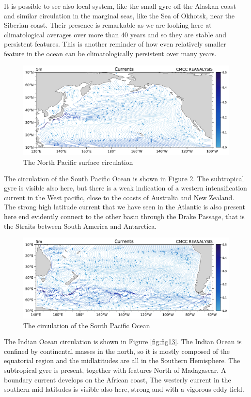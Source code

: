 It is possible to see also local system, like the small gyre off the Alaskan coast and similar circulation in the marginal seas, like the Sea of Okhotsk, near the Siberian coast. Their presence is remarkable as we are looking here at climatological averages over more than 40 years and so they are stable and persistent features. This is another reminder of how even relatively smaller feature in the ocean can be climatologically persistent over many years.

\begin{figure}[htpb]
\centering
\includegraphics[width = 0.4 \textwidth]{uploads/i36mage.png}
\caption{The North Pacific surface circulation} \label{fig:fig11}
\end{figure}

The circulation of the South Pacific Ocean is shown in Figure \ref{fig:fig12}. The subtropical gyre is visible also here, but there is a weak indication of a western intensification current in the West pacific, close to the coasts of Australia and New Zealand. The strong high latitude current that we have seen in the Atlantic is also present here end evidently connect to the other basin through the Drake Passage, that is the Straits between South America and Antarctica.

\begin{figure}[htpb]
\centering
\includegraphics[width = 0.5 \textwidth]{uploads/37image.png}
\caption{The circulation of the South Pacific Ocean} \label{fig:fig12}
\end{figure}

The Indian Ocean circulation is shown in Figure \ref{fig:fig13}. The Indian Ocean is confined by continental masses in the north, so it is mostly composed of the equatorial region and the midlatitudes are all in the Southern Hemisphere. The subtropical gyre is present, together with features North of Madagascar. A boundary current develops on the African coast, The westerly current in the southern mid-latitudes is visible also here, strong and with a vigorous eddy field.

